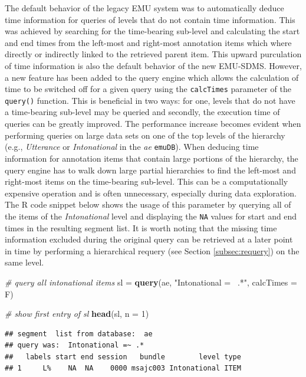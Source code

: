 \documentclass[]{book}
\newenvironment{Shaded}{\begin{snugshade}}{\end{snugshade}}
\newcommand{\CommentTok}[1]{\textcolor[rgb]{0.56,0.35,0.01}{\textit{#1}}}
\newcommand{\DataTypeTok}[1]{\textcolor[rgb]{0.13,0.29,0.53}{#1}}
\newcommand{\DecValTok}[1]{\textcolor[rgb]{0.00,0.00,0.81}{#1}}
\newcommand{\KeywordTok}[1]{\textcolor[rgb]{0.13,0.29,0.53}{\textbf{#1}}}
\newcommand{\NormalTok}[1]{#1}
\newcommand{\StringTok}[1]{\textcolor[rgb]{0.31,0.60,0.02}{#1}}
\theoremstyle{definition}
\theoremstyle{definition}
\theoremstyle{definition}
\theoremstyle{remark}
\begin{document}
The default behavior of the legacy EMU system was to automatically
deduce time information for queries of levels that do not contain time
information. This was achieved by searching for the time-bearing
sub-level and calculating the start and end times from the left-most and
right-most annotation items which where directly or indirectly linked to
the retrieved parent item. This upward purculation of time information
is also the default behavior of the new EMU-SDMS. However, a new feature
has been added to the query engine which allows the calculation of time
to be switched off for a given query using the \texttt{calcTimes}
parameter of the \texttt{query()} function. This is beneficial in two
ways: for one, levels that do not have a time-bearing sub-level may be
queried and secondly, the execution time of queries can be greatly
improved. The performance increase becomes evident when performing
queries on large data sets on one of the top levels of the hierarchy
(e.g., \emph{Utterance} or \emph{Intonational} in the \emph{ae}
\texttt{emuDB}). When deducing time information for annotation items
that contain large portions of the hierarchy, the query engine has to
walk down large partial hierarchies to find the left-most and right-most
items on the time-bearing sub-level. This can be a computationally
expensive operation and is often unnecessary, especially during data
exploration. The R code snippet below shows the usage of this parameter
by querying all of the items of the \emph{Intonational} level and
displaying the \texttt{NA} values for start and end times in the
resulting segment list. It is worth noting that the missing time
information excluded during the original query can be retrieved at a
later point in time by performing a hierarchical requery (see Section
\ref{subsec:requery}) on the same level.

\begin{Shaded}
\begin{Highlighting}[]
\CommentTok{# query all intonational items}
\NormalTok{sl =}\StringTok{ }\KeywordTok{query}\NormalTok{(ae, }\StringTok{"Intonational =~ .*"}\NormalTok{, }\DataTypeTok{calcTimes =}\NormalTok{ F)}

 \CommentTok{# show first entry of sl}
\KeywordTok{head}\NormalTok{(sl, }\DataTypeTok{n =} \DecValTok{1}\NormalTok{)}
\end{Highlighting}
\end{Shaded}

\begin{verbatim}
## segment  list from database:  ae 
## query was:  Intonational =~ .* 
##   labels start end session   bundle        level type
## 1     L%    NA  NA    0000 msajc003 Intonational ITEM
\end{verbatim}
\end{document}
